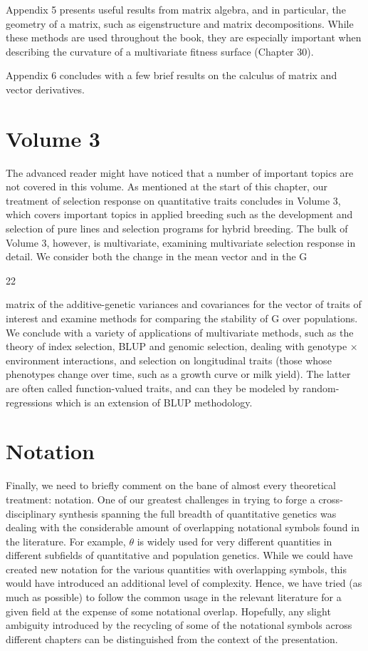 \documentclass{article}
\begin{document}
Appendix 5 presents useful results from matrix algebra, and in particular, the geometry of a matrix, such as eigenstructure and matrix decompositions. While these methods are used throughout the book, they are especially important when describing the curvature of a multivariate fitness surface (Chapter 30).

Appendix 6 concludes with a few brief results on the calculus of matrix and vector derivatives.

\section{Volume 3}
The advanced reader might have noticed that a number of important topics are not covered in this volume. As mentioned at the start of this chapter, our treatment of selection response on quantitative traits concludes in Volume 3, which covers important topics in applied breeding such as the development and selection of pure lines and selection programs for hybrid breeding. The bulk of Volume 3, however, is multivariate, examining multivariate selection response in detail. We consider both the change in the mean vector and in the G

22

matrix of the additive-genetic variances and covariances for the vector of traits of interest and examine methods for comparing the stability of G over populations. We conclude with a variety of applications of multivariate methods, such as the theory of index selection, BLUP and genomic selection, dealing with genotype × environment interactions, and selection on longitudinal traits (those whose phenotypes change over time, such as a growth curve or milk yield). The latter are often called function-valued traits, and can they be modeled by random-regressions which is an extension of BLUP methodology.

\section{Notation}
Finally, we need to briefly comment on the bane of almost every theoretical treatment: notation. One of our greatest challenges in trying to forge a cross-disciplinary synthesis spanning the full breadth of quantitative genetics was dealing with the considerable amount of overlapping notational symbols found in the literature. For example,  $ \theta $ is widely used for very different quantities in different subfields of quantitative and population genetics. While we could have created new notation for the various quantities with overlapping symbols, this would have introduced an additional level of complexity. Hence, we have tried (as much as possible) to follow the common usage in the relevant literature for a given field at the expense of some notational overlap. Hopefully, any slight ambiguity introduced by the recycling of some of the notational symbols across different chapters can be distinguished from the context of the presentation.
\end{document}
